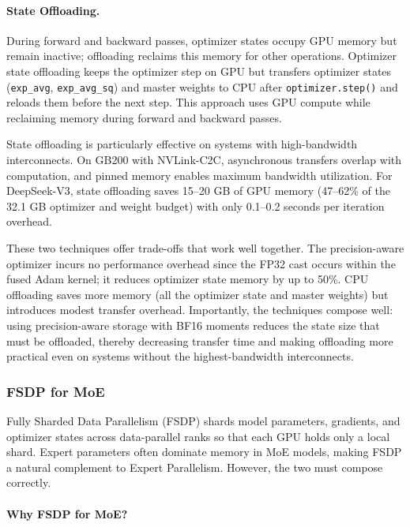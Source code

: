 \paragraph{State Offloading.}
During forward and backward passes, optimizer states occupy GPU memory but remain inactive; offloading reclaims this memory for other operations. Optimizer state offloading keeps the optimizer step on GPU but transfers optimizer states (\texttt{exp\_avg}, \texttt{exp\_avg\_sq}) and master weights to CPU after \texttt{optimizer.step()} and reloads them before the next step. This approach uses GPU compute while reclaiming memory during forward and backward passes.

State offloading is particularly effective on systems with high-bandwidth interconnects. On GB200 with NVLink-C2C, asynchronous transfers overlap with computation, and pinned memory enables maximum bandwidth utilization. For DeepSeek-V3, state offloading saves 15--20 GB of GPU memory (47--62\% of the 32.1 GB optimizer and weight budget) with only 0.1--0.2 seconds per iteration overhead.

These two techniques offer trade-offs that work well together. The precision-aware optimizer incurs no performance overhead since the FP32 cast occurs within the fused Adam kernel; it reduces optimizer state memory by up to 50\%. CPU offloading saves more memory (all the optimizer state and master weights) but introduces modest transfer overhead. Importantly, the techniques compose well: using precision-aware storage with BF16 moments reduces the state size that must be offloaded, thereby decreasing transfer time and making offloading more practical even on systems without the highest-bandwidth interconnects.

\subsubsection{FSDP for MoE}\label{sec:fsdp-ref}

Fully Sharded Data Parallelism (FSDP) \cite{zhao2023pytorchfsdp,rajbhandari2020zero} shards model parameters, gradients, and optimizer states across data-parallel ranks so that each GPU holds only a local shard. Expert parameters often dominate memory in MoE models, making FSDP a natural complement to Expert Parallelism. However, the two must compose correctly.

\paragraph{Why FSDP for MoE?}

